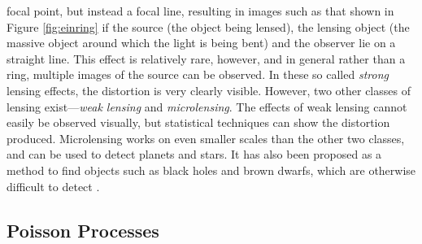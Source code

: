 \documentclass[a4paper,11pt]{article}
\begin{document}
   focal point, but instead a focal line, resulting in images such as that shown
   in Figure \ref{fig:einring} if the source (the object being lensed), the
   lensing object (the massive object around which the light is being bent) and
   the observer lie on a straight line. This effect is relatively rare, however,
   and in general rather than a ring, multiple images of the source can be
   observed. In these so called \emph{strong} lensing effects, the distortion is
   very clearly visible. However, two other classes of lensing
   exist---\emph{weak lensing} and \emph{microlensing}.  The effects of weak
   lensing cannot easily be observed visually, but statistical techniques can
   show the distortion produced. Microlensing works on even smaller scales than
   the other two classes, and can be used to detect planets and stars. It has
   also been proposed as a method to find objects such as black holes and brown
   dwarfs, which are otherwise difficult to detect
   \cite{schneider2006gravitational}.
\subsection{Poisson Processes}
\label{sec-2-2}
\end{document}
